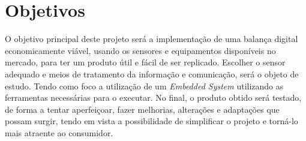 \section{Objetivos}
O objetivo principal deste projeto será a implementação de uma balança digital economicamente viável, usando os sensores e equipamentos disponíveis no mercado, para ter um produto útil e fácil de ser replicado.
\emptyline
Escolher o sensor adequado e meios de tratamento da informação e comunicação, será o objeto de estudo. Tendo como foco a utilização de um \textit{Embedded System} utilizando as ferramentas necessárias para o executar.
\emptyline
No final, o produto obtido será testado, de forma a tentar aperfeiçoar, fazer melhorias, alterações e adaptações que possam surgir, tendo em vista a possibilidade de simplificar o projeto e torná-lo mais atraente ao consumidor.
\newpage
